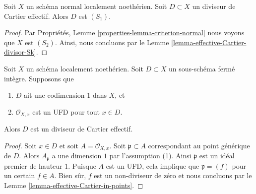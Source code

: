 \begin{lemma}
\label{lemma-normal-effective-Cartier-divisor-S1}
Soit  $X$  un schéma normal localement noethérien. Soit  $D \subset X$  un
diviseur de Cartier effectif. Alors  $D$  est  $(S_1)$.
\end{lemma}

\begin{proof}
Par Propriétés, Lemme  \ref{properties-lemma-criterion-normal}  nous voyons que  $X$  est  $(S_2)$.
Ainsi, nous concluons par le Lemme  \ref{lemma-effective-Cartier-divisor-Sk}.
\end{proof}

\begin{lemma}
\label{lemma-weil-divisor-is-cartier-UFD}
Soit  $X$  un schéma localement noethérien. Soit  $D \subset X$  un
sous-schéma fermé intègre. Supposons que
\begin{enumerate}
\item $D$  ait une codimension  $1$  dans  $X$, et
\item $\mathcal{O}_{X, x}$  est un UFD pour tout  $x \in D$.
\end{enumerate}
Alors  $D$  est un diviseur de Cartier effectif.
\end{lemma}

\begin{proof}
Soit  $x \in D$  et soit  $A = \mathcal{O}_{X, x}$. Soit  $\mathfrak p \subset A$  correspondant au point
générique de  $D$. Alors  $A_\mathfrak p$  a une dimension  $1$  par
l'assumption (1). Ainsi  $\mathfrak p$  est un idéal premier de hauteur  $1$.
Puisque  $A$  est un UFD, cela implique que  $\mathfrak p = (f)$  pour un certain
 $f \in A$. Bien sûr,  $f$  est un non-diviseur de zéro et nous concluons
par le Lemme  \ref{lemma-effective-Cartier-in-points}.
\end{proof}

